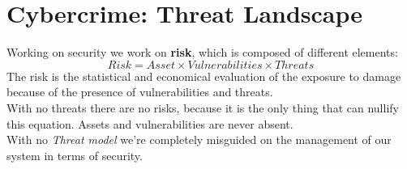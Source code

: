 \chapter{Cybercrime: Threat Landscape}
    Working on security we work on \textbf{risk}, which is composed of different elements:
    \begin{displaymath}
        Risk = Asset \times Vulnerabilities \times Threats
    \end{displaymath}
    The risk is the statistical and economical evaluation of the exposure to damage because of the presence of vulnerabilities and threats.\\
    With no threats there are no risks, because it is the only thing that can nullify this equation. Assets and vulnerabilities are never absent.\\
    With no \textit{Threat model} we're completely misguided on the management of our system in terms of security.
